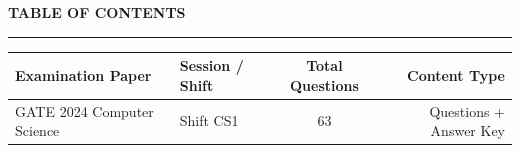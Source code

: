\documentclass[a4paper,10pt,twoside]{article}
\begin{document}
\newpage

\begin{center}
    {\Large\textbf{TABLE OF CONTENTS}}\\[0.4em]
    \rule{0.5\textwidth}{0.6pt}
\end{center}
\vspace{1em}

\noindent\begin{tabularx}{\linewidth}{|X|l|c|r|}
\hline
\textbf{Examination Paper} & \textbf{Session / Shift} & \textbf{Total Questions} & \textbf{Content Type} \\
\hline

GATE 2024 Computer Science & Shift CS1 & 63 & Questions + Answer Key \\ \hline
\end{tabularx}

\vspace{1.5em}

\newpage
\end{document}

